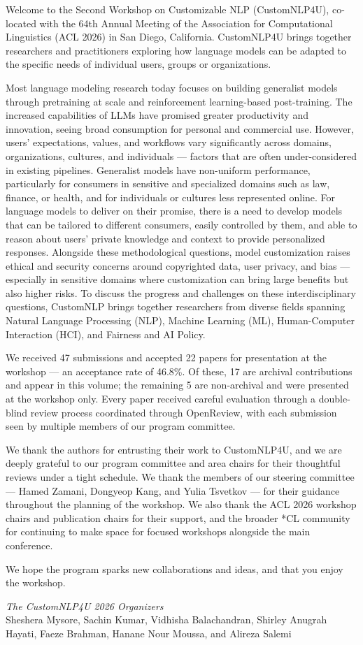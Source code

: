 

Welcome to the Second Workshop on Customizable NLP (CustomNLP4U), co-located
with the 64th Annual Meeting of the Association for Computational Linguistics
(ACL 2026) in San Diego, California. CustomNLP4U brings together researchers
and practitioners exploring how language models can be adapted to the specific 
needs of individual users, groups or organizations.

Most language modeling research today focuses on building generalist models 
through pretraining at scale and reinforcement learning-based post-training. 
The increased capabilities of LLMs have promised greater productivity and 
innovation, seeing broad consumption for personal and commercial use. However, 
users' expectations, values, and workflows vary significantly across domains, 
organizations, cultures, and individuals — factors that are often 
under-considered in existing pipelines. Generalist models have non-uniform 
performance, particularly for consumers in sensitive and specialized domains 
such as law, finance, or health, and for individuals or cultures less 
represented online. For language models to deliver on their promise, there is 
a need to develop models that can be tailored to different consumers, easily 
controlled by them, and able to reason about users' private knowledge and 
context to provide personalized responses. Alongside these methodological 
questions, model customization raises ethical and security concerns around 
copyrighted data, user privacy, and bias — especially in sensitive domains 
where customization can bring large benefits but also higher risks. To discuss
the progress and challenges on these interdisciplinary questions, CustomNLP brings 
together researchers from diverse fields spanning Natural Language Processing (NLP), 
Machine Learning (ML),  Human-Computer Interaction (HCI), and Fairness and AI Policy. 

We received 47 submissions and accepted 22 papers for presentation at the
workshop --- an acceptance rate of 46.8\%. Of these, 17 are
archival contributions and appear in this volume; the remaining 5 are
non-archival and were presented at the workshop only. Every paper received
careful evaluation through a double-blind review process coordinated through
OpenReview, with each submission seen by multiple members of our program
committee.

We thank the authors for entrusting their work to CustomNLP4U, and we are
deeply grateful to our program committee and area chairs for their thoughtful
reviews under a tight schedule. We thank the members of our steering
committee --- Hamed Zamani, Dongyeop Kang, and Yulia Tsvetkov --- for their
guidance throughout the planning of the workshop. We also thank the ACL 2026
workshop chairs and publication chairs for their support, and the broader
*CL community for continuing to make space for focused workshops alongside
the main conference.

We hope the program sparks new collaborations and ideas, and that you enjoy
the workshop.

\vspace{1em}
\noindent
\textit{The CustomNLP4U 2026 Organizers}\\
Sheshera Mysore, Sachin Kumar, Vidhisha Balachandran, Shirley Anugrah Hayati,
Faeze Brahman, Hanane Nour Moussa, and Alireza Salemi
